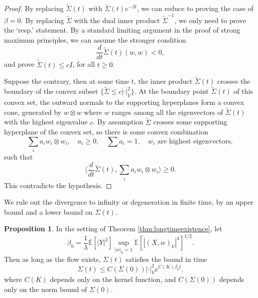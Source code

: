 \documentclass[a4paper]{article}
\theoremstyle{definition}
\newtheorem{prop}[thm]{Proposition}
\newcommand{\E}{\mathbb{E}}
\newcommand{\1}{\mathbbm{1}}
\begin{document}
	
	
	\begin{proof}
		By replacing $\tilde{\Sigma}(t)$ with $\tilde{\Sigma}(t) e^{-\beta t}$, we can reduce to proving the case of $\beta=0$. By replacing $\tilde{\Sigma}$ with the dual inner product $\tilde{\Sigma}^{-1}$, we only need to prove the `resp.' statement. By a standard limiting argument in the proof of strong maximum principles, we can assume the stronger condition
		\[
		\frac{d}{dt} \tilde{\Sigma}(t)(w, w) < 0,
		\]
		and prove $
		\tilde{\Sigma} (t) \leq c I$,
		for all $t\geq 0$. 
		
		
		Suppose the contrary, then at some time $t$, the inner product $\tilde{\Sigma}(t)$ crosses the boundary of the convex subset $\{ \tilde{\Sigma} \leq c |\cdot|_V^2 \}$. At the boundary point $\tilde{\Sigma}(t)$ of this convex set, the outward normals to the supporting hyperplanes form a convex cone, generated by $w\otimes w$ where $w$ ranges among all the eigenvectors of $\tilde{\Sigma}(t)$ with the highest eigenvalue $c$. By assumption $\tilde{\Sigma}$ crosses some supporting hyperplane of the convex set, so there is some convex combination 
		\[
		\sum_i a_i w_i\otimes w_i,\quad a_i\geq 0,\quad \sum a_i=1, \quad \text{$w_i$ are highest eigenvectors},
		\]
		such that 
		\[
		\langle \frac{d}{dt}\tilde{\Sigma}(t) ,  \sum_i a_i w_i\otimes w_i \rangle \geq 0. 
		\]
		This contradicts the hypothesis. 
	\end{proof}
	
	
	
	
	
	
	
	
	
	We  rule out the divergence to infinity or degeneration in finite time, by an upper bound and a lower bound on $\Sigma(t)$. 
	
	
	
	
	
	
	
	
	
	
	
	
	
	
	
	\begin{prop}
		\label{prop:eigenvalueboundevolution}
		In the setting of Theorem \ref{thm:longtimeexistence},
		let
		\[
		\beta_0= \frac{1}{\lambda} \E[|Y|^2 ] \sup_{|w|_V=1}  \E[  |(X, w)_V|^4  ]^{1/2} .
		\]
		Then as long as the flow exists, $\Sigma(t)$  satisfies the bound in time
		\[
		\Sigma (t)\leq  C(\Sigma(0)) |\cdot|_V^2 e^{C(K)\beta_0 t}.
		\]
		where $C(K)$ depends only on the kernel function, and $C(\Sigma(0))$ depends only on  the norm bound of $\Sigma(0)$. 
	\end{prop}
	
\end{document}
